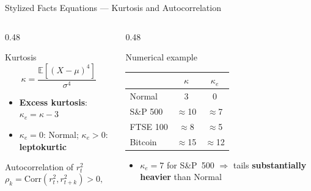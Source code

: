 \documentclass[9pt, aspectratio=169, t]{beamer}
\theoremstyle{definition}
\newcommand{\E}{\mathbb{E}}
\newcommand{\Corr}{\text{Corr}}
\begin{document}
\begin{frame}{Stylized Facts Equations --- Kurtosis and Autocorrelation}
\vspace{-0.2cm}
\begin{columns}[T]
\begin{column}{0.48\textwidth}
\begin{block}{Kurtosis}
\vspace{-0.3cm}
\[
\kappa = \frac{\E[(X - \mu)^4]}{\sigma^4}
\]
\vspace{-0.4cm}
\begin{itemize}\setlength\itemsep{0pt}
\item \textbf{Excess kurtosis}: $\kappa_e = \kappa - 3$
\item $\kappa_e = 0$: Normal; $\kappa_e > 0$: \textbf{leptokurtic}
\end{itemize}
\end{block}
\begin{block}{Autocorrelation of $r_t^2$}
\vspace{-0.3cm}
\[
\rho_k = \Corr(r_t^2, r_{t+k}^2) > 0, \quad k \text{ large}
\]
\vspace{-0.3cm}
\end{block}
\end{column}
\begin{column}{0.48\textwidth}
\begin{exampleblock}{Numerical example}
\renewcommand{\arraystretch}{1.0}
\begin{tabular}{lcc}
\toprule
& $\kappa$ & $\kappa_e$ \\
\midrule
Normal & 3 & 0 \\
S\&P 500 & $\approx$10 & $\approx$7 \\
FTSE 100 & $\approx$8 & $\approx$5 \\
Bitcoin & $\approx$15 & $\approx$12 \\
\bottomrule
\end{tabular}
\end{exampleblock}
\begin{itemize}\setlength\itemsep{0pt}
\item {\small $\kappa_e = 7$ for S\&P~500 $\Rightarrow$ tails \textbf{substantially heavier} than Normal}
\end{itemize}
\end{column}
\end{columns}
\end{frame}
\end{document}
